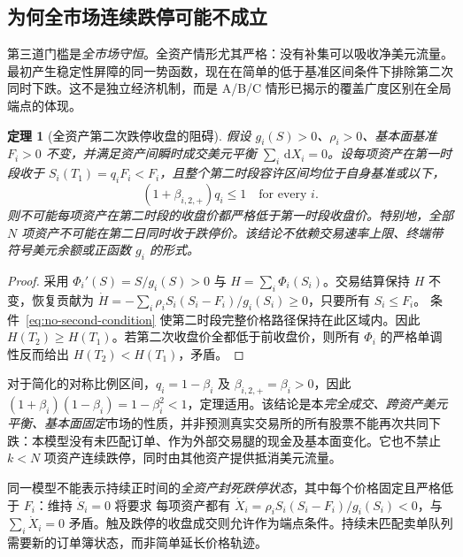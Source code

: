 \documentclass[11pt]{article}
\numberwithin{equation}{section}
\newtheorem{theorem}{定理}[section]
\theoremstyle{definition}
\theoremstyle{remark}
\newcommand{\dd}{\,\mathrm{d}}
\begin{document}
\subsection{为何全市场连续跌停可能不成立}\label{subsec:multiday-full}
第三道门槛是\emph{全市场守恒}。全资产情形尤其严格：没有补集可以吸收净美元流量。最初产生稳定性屏障的同一势函数，现在在简单的低于基准区间条件下排除第二次同时下跌。这不是独立经济机制，而是 A/B/C 情形已揭示的覆盖广度区别在全局端点的体现。
\begin{theorem}[全资产第二次跌停收盘的阻碍]\label{thm:no-second-global}
假设 $g_i(S)>0$、$\rho_i>0$、基本面基准 $F_i>0$ 不变，并满足资产间瞬时成交美元平衡 $\sum_i\dd X_i=0$。设每项资产在第一时段收于 $S_i(T_1)=q_iF_i<F_i$，且\emph{整个第二时段容许区间}均位于自身基准或以下，
\begin{equation}\label{eq:no-second-condition}
 (1+\beta_{i,2,+})q_i\le1\quad\text{for every }i.
\end{equation}
则不可能\emph{每项}资产在第二时段的收盘价都严格低于第一时段收盘价。特别地，全部 $N$ 项资产不可能在第二日同时收于跌停价。该结论不依赖交易速率上限、终端带符号美元余额或正函数 $g_i$ 的形式。
\end{theorem}
\begin{proof}
采用 $\Phi_i'(S)=S/g_i(S)>0$ 与 $H=\sum_i\Phi_i(S_i)$。交易结算保持 $H$ 不变，恢复贡献为
$\dot H=-\sum_i\rho_i S_i(S_i-F_i)/g_i(S_i)\ge0$，只要所有 $S_i\le F_i$。
条件~\eqref{eq:no-second-condition} 使第二时段完整价格路径保持在此区域内。因此 $H(T_2)\ge H(T_1)$。若第二次收盘价全都低于前收盘价，则所有 $\Phi_i$ 的严格单调性反而给出 $H(T_2)<H(T_1)$，矛盾。
\end{proof}

对于简化的对称比例区间，$q_i=1-\beta_i$ 及
$\beta_{i,2,+}=\beta_i>0$，因此
$(1+\beta_i)(1-\beta_i)=1-\beta_i^2<1$，定理适用。该结论是本\emph{完全成交、跨资产美元平衡、基本面固定}市场的性质，并非预测真实交易所的所有股票不能再次共同下跌：本模型没有未匹配订单、作为外部交易腿的现金及基本面变化。它也不禁止 $k<N$ 项资产连续跌停，同时由其他资产提供抵消美元流量。


同一模型不能表示持续正时间的\emph{全资产封死跌停状态}，其中每个价格固定且严格低于 $F_i$：维持 $\dot S_i=0$ 将要求
每项资产都有 $\dot X_i=\rho_i S_i(S_i-F_i)/g_i(S_i)<0$，与 $\sum_i\dot X_i=0$ 矛盾。触及跌停的收盘成交则允许作为端点条件。持续未匹配卖单队列需要新的订单簿状态，而非简单延长价格轨迹。
\end{document}
